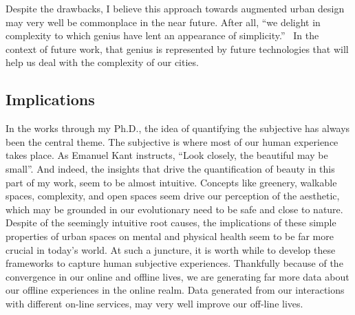 Despite the drawbacks, I believe this approach towards augmented urban design may very well be commonplace in the near future. After all, ``we delight in complexity to which genius have lent an appearance of simplicity.''~\cite{de2008architecture} In the context of future work, that genius is represented by future technologies that will help us deal with the complexity of our cities.
 
%
\subsection{Implications}
In the works through my Ph.D., the idea of quantifying the subjective has always been the central theme. The subjective is where most of our human experience takes place. As Emanuel Kant instructs, ``Look closely, the beautiful may be small''. And indeed, the insights that drive the quantification of beauty in this part of my work, seem to be almost intuitive. Concepts like greenery, walkable spaces, complexity, and open spaces seem drive our perception of the aesthetic, which may be grounded in our evolutionary need to be safe and close to nature. Despite of the seemingly intuitive root causes, the implications of these simple properties of urban spaces on mental and physical health seem to be far more crucial in today's world. 
At such a juncture, it is worth while to develop these frameworks to capture human subjective experiences. Thankfully because of the convergence in our online and offline lives, we are generating far more data about our offline experiences in the online realm. Data generated from our interactions with different on-line services, may very well improve our off-line lives.